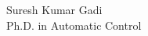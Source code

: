 \documentclass{article}
\begin{document}
\begin{minipage}{0.70 \textwidth}
	{\fontsize{3.25em}{1em} \selectfont Suresh Kumar Gadi} \\
	Ph.D. in Automatic Control
\end{minipage}
\begin{minipage}{0.29 \textwidth}
\end{minipage}
\end{document}
